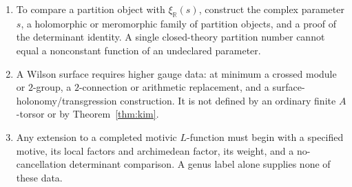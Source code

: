 \begin{openproblem}
\begin{enumerate}
\item To compare a partition object with \(\xi_{\mathbb R}(s)\), construct
the complex parameter \(s\), a holomorphic or meromorphic family of
partition objects, and a proof of the determinant identity.  A single
closed-theory partition number cannot equal a nonconstant function of an
undeclared parameter.

\item A Wilson surface requires higher gauge data: at minimum a crossed
module or \(2\)-group, a \(2\)-connection or arithmetic replacement, and a
surface-holonomy/transgression construction.  It is not defined by an
ordinary finite \(A\)-torsor or by Theorem~\ref{thm:kim}.

\item Any extension to a completed motivic \(L\)-function must begin with
a specified motive, its local factors and archimedean factor, its weight,
and a no-cancellation determinant comparison.  A genus label alone supplies
none of these data.
\end{enumerate}
\end{openproblem}

